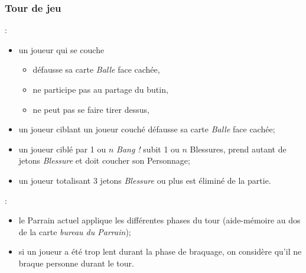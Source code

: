 \documentclass[11pt]{beamer}
\begin{document}
	\begin{frame}
		\frametitle{Tour de jeu}
		
		:
		\begin{itemize}
			\item un joueur qui se couche
				\begin{itemize}
					\item défausse sa carte \emph{Balle} face cachée,
					\item ne participe pas au partage du butin,
					\item ne peut pas se faire tirer dessus,
				\end{itemize}
			\item un joueur ciblant un joueur couché défausse sa carte \emph{Balle} face cachée;
			\item un joueur ciblé par 1 ou $n$ \emph{Bang !} subit 1 ou $n$ Blessures, prend autant de jetons \emph{Blessure} et doit coucher son Personnage;
			\item un joueur totalisant 3 jetons \emph{Blessure} ou plus est éliminé de la partie.
		\end{itemize}
	
		:
		\begin{itemize}
			\item le Parrain actuel applique les différentes phases du tour (aide-mémoire au dos de la carte \emph{bureau du Parrain});
			\item si un joueur a été trop lent durant la phase de braquage, on considère qu'il ne braque personne durant le tour.
		\end{itemize}
	\end{frame}
\end{document}
